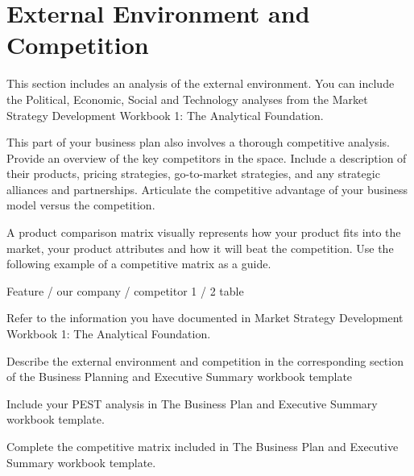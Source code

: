 \section{External Environment and Competition}

This section includes an analysis of the external environment. You can include the
Political, Economic, Social and Technology analyses from the Market Strategy
Development Workbook 1: The Analytical Foundation.

This part of your business plan also involves a thorough competitive analysis. Provide
an overview of the key competitors in the space. Include a description of their
products, pricing strategies, go-to-market strategies, and any strategic alliances and
partnerships. Articulate the competitive advantage of your business model versus the
competition.

A product comparison matrix visually represents how your product fits into the
market, your product attributes and how it will beat the competition. Use the
following example of a competitive matrix as a guide.

Feature / our company / competitor 1 / 2 table

Refer to the information you have documented in Market Strategy
Development Workbook 1: The Analytical Foundation.

Describe the external environment and competition in the
corresponding section of the Business Planning and Executive
Summary workbook template

Include your PEST analysis in The Business Plan and Executive
Summary workbook template.

Complete the competitive matrix included in The Business Plan and
Executive Summary workbook template.

